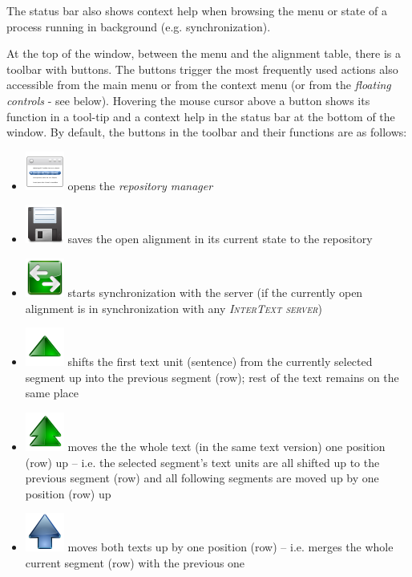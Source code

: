 \documentclass[a4paper,10pt,oneside]{book}
\newcommand{\ITserver}{\textit{\textsc{InterText server}}\xspace}
\begin{document}
The status bar also shows context help when browsing the menu or state of a process running in background (e.g. synchronization).

At the top of the window, between the menu and the alignment table, there is a toolbar with buttons. The buttons trigger the most frequently used actions also accessible from the main menu or from the context menu (or from the \emph{floating controls} - see below). Hovering the mouse cursor above a button shows its function in a tool-tip and a context help in the status bar at the bottom of the window. By default, the buttons in the toolbar and their functions are as follows:

\begin{itemize}
	\item \includegraphics[height=2ex]{../images/48/manager.png} opens the \emph{repository manager}
	\item \includegraphics[height=2ex]{../images/48/document-save.png} saves the open alignment in its current state to the repository
	\item \includegraphics[height=2ex]{../images/48/synchronize.png} starts synchronization with the server (if the currently open alignment is in synchronization with any \ITserver)
	\item \includegraphics[height=2ex]{../images/48/arrow-up.png} shifts the first text unit (sentence) from the currently selected segment up into the previous segment (row); rest of the text remains on the same place
	\item \includegraphics[height=2ex]{../images/48/arrow-up-double.png} moves the the whole text (in the same text version) one position (row) up -- i.e. the selected segment's text units are all shifted up to the previous segment (row) and all following segments are moved up by one position (row) up
	\item \includegraphics[height=2ex]{../images/48/go-up.png} moves both texts up by one position (row) -- i.e. merges the whole current segment (row) with the previous one

\end{itemize}
\end{document}
